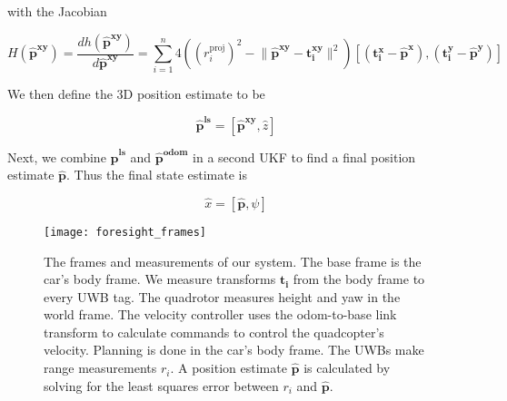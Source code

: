 with the Jacobian 

$$
    H(\bm{\hat{p}^{xy}}) = \frac{dh(\bm{\hat{p}^{xy}})}{d\bm{\hat{p}^{xy}}} = \sum_{i=1}^{n} 4((r_i^{\text{proj}})^2 - \lVert \bm{\hat{p}^{xy}} - \bm{t_i^{xy}} \rVert^2)[(\bm{t_i^{x}} - \bm{\hat{p}^{x}}), (\bm{t_i^{y}} - \bm{\hat{p}^{y}})]
$$

We then define the 3D position estimate to be

$$
   \bm{\hat{p}^{ls}} = [\bm{\hat{p}^{xy}}, \hat{z}]
$$

Next, we combine $\bm{\hat{p}^{ls}}$ and $\bm{\hat{p}^{\text{odom}}}$ in a second UKF to find
a final position estimate $\bm{\hat{p}}$. Thus the final state estimate is

$$
   \hat{x} = [\bm{\hat{p}}, \psi]
$$


\begin{figure}[tb!]
  \centering
    \texttt{[image: foresight\_frames]}
  \caption{The frames and measurements of our system. The base frame
   is the car's body frame. We measure transforms $\bm{t_{i}}$ from the body
   frame to every UWB tag. The quadrotor measures height and yaw in the world
   frame. The velocity controller uses the odom-to-base\textunderscore 
   link transform to calculate commands to control the quadcopter's velocity.
   Planning is done in the car's body frame.
   The UWBs make range measurements $r_{i}$. A position estimate $\bm{\hat{p}}$
   is calculated by solving for the least squares error between $r_{i}$ and $\bm{\hat{p}}$.}
  \label{fig:frames}
\end{figure}







